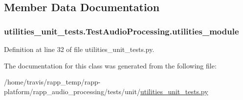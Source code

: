\subsection{Member Data Documentation}
\hypertarget{classutilities__unit__tests_1_1TestAudioProcessing_a8f0150434b471b9822c2d6ff1f89ca4f}{
\subsubsection[{utilities\-\_\-module}]{\setlength{\rightskip}{0pt plus 5cm}utilities\-\_\-unit\-\_\-tests.\-Test\-Audio\-Processing.\-utilities\-\_\-module}}\label{classutilities__unit__tests_1_1TestAudioProcessing_a8f0150434b471b9822c2d6ff1f89ca4f}


Definition at line 32 of file utilities\-\_\-unit\-\_\-tests.\-py.



The documentation for this class was generated from the following file\-:\begin{DoxyCompactItemize}
\item 
/home/travis/rapp\-\_\-temp/rapp-\/platform/rapp\-\_\-audio\-\_\-processing/tests/unit/\hyperlink{utilities__unit__tests_8py}{utilities\-\_\-unit\-\_\-tests.\-py}\end{DoxyCompactItemize}
